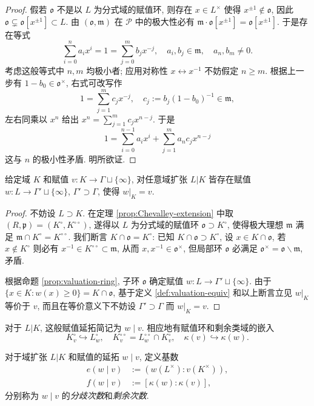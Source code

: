 \begin{proof}
	假若 $\mathfrak{o}$ 不是以 $L$ 为分式域的赋值环, 则存在 $x \in L^\times$ 使得 $x^{\pm 1} \notin \mathfrak{o}$, 因此 $\mathfrak{o} \subsetneq \mathfrak{o}[x^{\pm 1}] \subset L$. 由 $(\mathfrak{o}, \mathfrak{m})$ 在 $\mathcal{P}$ 中的极大性必有 $\mathfrak{m} \cdot \mathfrak{o}[x^{\pm 1}] = \mathfrak{o}[x^{\pm 1}]$. 于是存在等式
	\[ \sum_{i=0}^n a_i x^i= 1 = \sum_{j=0}^m b_j x^{-j}, \quad a_i, b_j \in \mathfrak{m}, \quad a_n, b_m \neq 0. \]
	考虑这般等式中 $n, m$ 均极小者; 应用对称性 $x \leftrightarrow x^{-1}$ 不妨假定 $n \geq m$. 根据上一步有 $1-b_0 \in \mathfrak{o}^\times$, 右式可改写作
	\[ 1 = \sum_{j=1}^m c_j x^{-j}, \quad c_j := b_j (1-b_0)^{-1} \in \mathfrak{m}, \]
	左右同乘以 $x^n$ 给出 $x^n = \sum_{j=1}^m c_j x^{n-j}$. 于是
	\[ 1 = \sum_{i=0}^{n-1} a_i x^i +\sum_{j=1}^m a_n c_j x^{n-j}  \]
	这与 $n$ 的极小性矛盾. 明所欲证.
\end{proof}

\begin{theorem}\label{prop:valuation-ext}
	给定域 $K$ 和赋值 $v: K \to \Gamma \sqcup \{\infty\}$, 对任意域扩张 $L|K$ 皆存在赋值 $w: L \to \Gamma' \sqcup \{\infty\}$, $\Gamma' \supset \Gamma$, 使得 $w|_K = v$.
\end{theorem}
\begin{proof}
	不妨设 $L \supset K$. 在定理 \ref{prop:Chevalley-extension} 中取 $(R, \mathfrak{p}) = (K^\circ, K^{\circ\circ})$, 遂得以 $L$ 为分式域的赋值环 $\mathfrak{o} \supset K^\circ$, 使得极大理想 $\mathfrak{m}$ 满足 $\mathfrak{m} \cap K^\circ = K^{\circ\circ}$. 我们断言 $K \cap \mathfrak{o} = K^\circ$: 已知 $K \cap \mathfrak{o} \supset K^\circ$, 设 $x \in K \cap \mathfrak{o}$, 若 $x \notin K^\circ$ 则必有 $x^{-1} \in K^{\circ\circ} \subset \mathfrak{m}$, 从而 $x, x^{-1} \in \mathfrak{o}^\times$, 但局部环 $\mathfrak{o}$ 必满足 $\mathfrak{o}^\times = \mathfrak{o} \smallsetminus \mathfrak{m}$, 矛盾.

	根据命题 \ref{prop:valuation-ring}, 子环 $\mathfrak{o}$ 确定赋值 $w: L \to \Gamma' \sqcup \{\infty\}$. 由于 $\{x \in K: w(x) \geq 0 \} = K \cap \mathfrak{o}$, 基于定义 \ref{def:valuation-equiv} 和以上断言立见 $w|_K$ 等价于 $v$, 而且在等价意义下不妨设 $\Gamma' \supset \Gamma$ 而 $w|_K = v$.
\end{proof}
对于 $L|K$, 这般赋值延拓简记为 $w \mid v$. 相应地有赋值环和剩余类域的嵌入
\[ K^\circ_v \hookrightarrow L^\circ_w, \quad K^{\circ\circ}_v = L^{\circ\circ}_w \cap K^\circ_v, \quad \kappa(v) \hookrightarrow \kappa(w). \]

\begin{definition}
	对于域扩张 $L|K$ 和赋值的延拓 $w \mid v$, 定义基数
	\begin{align*}
		e(w \mid v) & := ( w(L^\times) : v(K^\times) ), \\
		f(w \mid v) & := [ \kappa(w): \kappa(v) ],
	\end{align*}
	分别称为 $w \mid v$ 的\emph{分歧次数}和\emph{剩余次数}. 
\end{definition}

